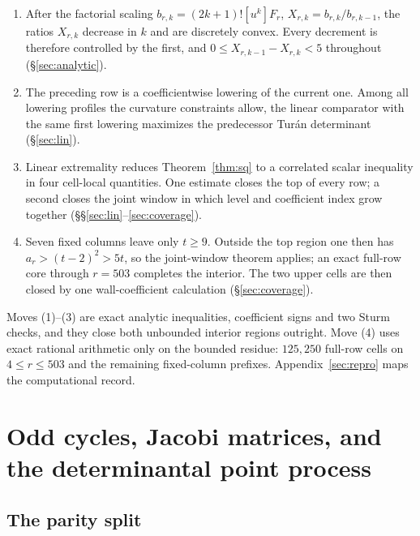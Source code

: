 \documentclass[11pt,a4paper]{article}
\theoremstyle{plain}
\theoremstyle{definition}
\theoremstyle{remark}
\begin{document}
\begin{enumerate}[label=\textup{(\arabic*)},leftmargin=2.2em]
\item After the factorial scaling $b_{r,k}=(2k+1)![u^k]F_r$,
  $X_{r,k}=b_{r,k}/b_{r,k-1}$, the ratios $X_{r,k}$ decrease in $k$ and are
  discretely convex. Every decrement is therefore controlled by the first, and
  $0\le X_{r,k-1}-X_{r,k}<5$ throughout (\S\ref{sec:analytic}).
\item The preceding row is a coefficientwise lowering of the current one. Among
  all lowering profiles the curvature constraints allow, the linear comparator
  with the same first lowering maximizes the predecessor Tur\'an determinant
  (\S\ref{sec:lin}).
\item Linear extremality reduces Theorem~\ref{thm:sq} to a correlated scalar
  inequality in four cell-local quantities. One estimate closes the top of every
  row; a second closes the joint window in which level and coefficient index
  grow together (\S\S\ref{sec:lin}--\ref{sec:coverage}).
\item Seven fixed columns leave only $t\ge9$. Outside the top region one then
  has $a_r>(t-2)^2>5t$, so the joint-window theorem applies; an exact full-row
  core through $r=503$ completes the interior. The two upper cells are then
  closed by one wall-coefficient calculation (\S\ref{sec:coverage}).
\end{enumerate}

Moves (1)--(3) are exact analytic inequalities, coefficient signs and two Sturm
checks, and they close both unbounded interior regions outright. Move (4) uses exact
rational arithmetic only on the bounded residue: $125{,}250$ full-row cells on
$4\le r\le503$ and the remaining fixed-column prefixes.
Appendix~\ref{sec:repro} maps the computational record.

\section{Odd cycles, Jacobi matrices, and the determinantal point
process}\label{sec:faces}

\subsection{The parity split}\label{sec:parity}
\end{document}
